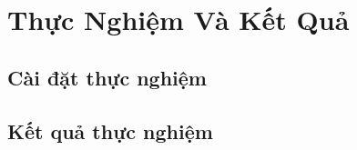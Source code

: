 \chapter{Thực Nghiệm Và Kết Quả}
\ifpdf
    \graphicspath{{Chapter3/Chapter3Figs/PNG/}{Chapter3/Chapter3Figs/PDF/}{Chapter3/Chapter3Figs/}}
\else
    \graphicspath{{Chapter3/Chapter3Figs/EPS/}{Chapter3/Chapter3Figs/}}
\fi

\section{Cài đặt thực nghiệm}

\section{Kết quả thực nghiệm}  

